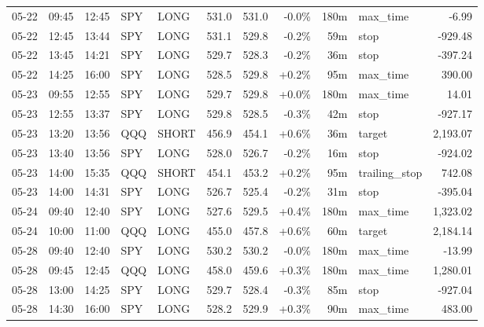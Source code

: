 \documentclass[11pt,a4paper,twoside]{article}
\begin{document}
\begin{center}
\begin{longtable}{>{\color{txtmain}}l l l l l r r r r >{\color{txtmain}}l r}
05-22 & 09:45 & 12:45 & SPY & LONG & 531.0 & 531.0 & \textcolor{lossred}{-0.0\%} & 180m & max\_time & \textcolor{lossred}{-6.99} \\
05-22 & 12:45 & 13:44 & SPY & LONG & 531.1 & 529.8 & \textcolor{lossred}{-0.2\%} & 59m & stop & \textcolor{lossred}{-929.48} \\
05-22 & 13:45 & 14:21 & SPY & LONG & 529.7 & 528.3 & \textcolor{lossred}{-0.2\%} & 36m & stop & \textcolor{lossred}{-397.24} \\
05-22 & 14:25 & 16:00 & SPY & LONG & 528.5 & 529.8 & \textcolor{wingreen}{+0.2\%} & 95m & max\_time & \textcolor{wingreen}{390.00} \\
05-23 & 09:55 & 12:55 & SPY & LONG & 529.7 & 529.8 & \textcolor{wingreen}{+0.0\%} & 180m & max\_time & \textcolor{wingreen}{14.01} \\
05-23 & 12:55 & 13:37 & SPY & LONG & 529.8 & 528.5 & \textcolor{lossred}{-0.3\%} & 42m & stop & \textcolor{lossred}{-927.17} \\
05-23 & 13:20 & 13:56 & QQQ & SHORT & 456.9 & 454.1 & \textcolor{wingreen}{+0.6\%} & 36m & target & \textcolor{wingreen}{2,193.07} \\
05-23 & 13:40 & 13:56 & SPY & LONG & 528.0 & 526.7 & \textcolor{lossred}{-0.2\%} & 16m & stop & \textcolor{lossred}{-924.02} \\
05-23 & 14:00 & 15:35 & QQQ & SHORT & 454.1 & 453.2 & \textcolor{wingreen}{+0.2\%} & 95m & trailing\_stop & \textcolor{wingreen}{742.08} \\
05-23 & 14:00 & 14:31 & SPY & LONG & 526.7 & 525.4 & \textcolor{lossred}{-0.2\%} & 31m & stop & \textcolor{lossred}{-395.04} \\
05-24 & 09:40 & 12:40 & SPY & LONG & 527.6 & 529.5 & \textcolor{wingreen}{+0.4\%} & 180m & max\_time & \textcolor{wingreen}{1,323.02} \\
05-24 & 10:00 & 11:00 & QQQ & LONG & 455.0 & 457.8 & \textcolor{wingreen}{+0.6\%} & 60m & target & \textcolor{wingreen}{2,184.14} \\
05-28 & 09:40 & 12:40 & SPY & LONG & 530.2 & 530.2 & \textcolor{lossred}{-0.0\%} & 180m & max\_time & \textcolor{lossred}{-13.99} \\
05-28 & 09:45 & 12:45 & QQQ & LONG & 458.0 & 459.6 & \textcolor{wingreen}{+0.3\%} & 180m & max\_time & \textcolor{wingreen}{1,280.01} \\
05-28 & 13:00 & 14:25 & SPY & LONG & 529.7 & 528.4 & \textcolor{lossred}{-0.3\%} & 85m & stop & \textcolor{lossred}{-927.04} \\
05-28 & 14:30 & 16:00 & SPY & LONG & 528.2 & 529.9 & \textcolor{wingreen}{+0.3\%} & 90m & max\_time & \textcolor{wingreen}{483.00} \\

\end{longtable}
\end{center}
\end{document}
